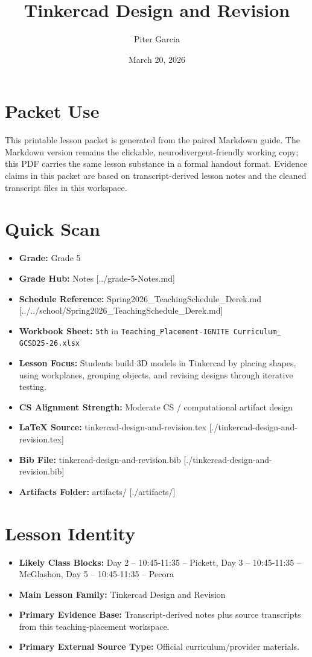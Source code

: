 \documentclass[11pt]{article}
\title{Tinkercad Design and Revision}
\author{Piter Garcia}
\date{March 20, 2026}
\begin{document}
\maketitle
\section*{Packet Use}
This printable lesson packet is generated from the paired Markdown guide. The Markdown version remains the clickable, neurodivergent-friendly working copy; this PDF carries the same lesson substance in a formal handout format. Evidence claims in this packet are based on transcript-derived lesson notes and the cleaned transcript files in this workspace.

\section*{Quick Scan}
\begin{itemize}[leftmargin=*]
\item \textbf{Grade:} Grade 5
\item \textbf{Grade Hub:} Notes [../grade-5-Notes.md]
\item \textbf{Schedule Reference:} Spring2026\_TeachingSchedule\_Derek.md [../../school/Spring2026\_TeachingSchedule\_Derek.md]
\item \textbf{Workbook Sheet:} \texttt{5th} in \texttt{Teaching\_Placement-IGNITE Curriculum\_ GCSD25-26.xlsx}
\item \textbf{Lesson Focus:} Students build 3D models in Tinkercad by placing shapes, using workplanes, grouping objects, and revising designs through iterative testing.
\item \textbf{CS Alignment Strength:} Moderate CS / computational artifact design
\item \textbf{LaTeX Source:} tinkercad-design-and-revision.tex [./tinkercad-design-and-revision.tex]
\item \textbf{Bib File:} tinkercad-design-and-revision.bib [./tinkercad-design-and-revision.bib]
\item \textbf{Artifacts Folder:} artifacts/ [./artifacts/]
\end{itemize}

\section*{Lesson Identity}
\begin{itemize}[leftmargin=*]
\item \textbf{Likely Class Blocks:} Day 2 -- 10:45-11:35 -- Pickett, Day 3 -- 10:45-11:35 -- McGlashon, Day 5 -- 10:45-11:35 -- Pecora
\item \textbf{Main Lesson Family:} Tinkercad Design and Revision
\item \textbf{Primary Evidence Base:} Transcript-derived notes plus source transcripts from this teaching-placement workspace.
\item \textbf{Primary External Source Type:} Official curriculum/provider materials.
\end{itemize}
\end{document}
